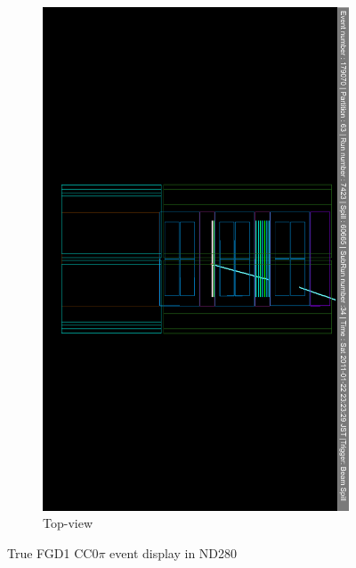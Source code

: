 \begin{itemize}
\begin{figure}[h]
\begin{subfigure}[t]{0.49\textwidth}
			\includegraphics[width=\textwidth, trim={10mm 150mm 10mm 150mm}, clip]{figures/numu/evtdisplay/CC0pi_7423_34_179070_ortX0Z_all}
			\caption{Top-view}
		\end{subfigure}
		\caption{True FGD1 CC0$\pi$ event display in ND280}
		\label{fig:cc0pi_evtdisplay}
	\end{figure}


\end{itemize}

